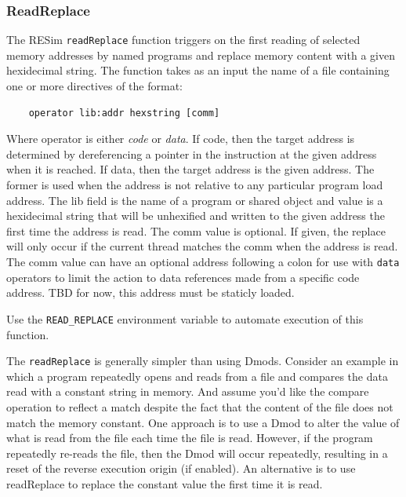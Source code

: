 \documentclass[titlepage]{article}
\begin{document}
\subsubsection{ReadReplace}
\label{read-replace}
The RESim {\tt readReplace} function triggers on the first reading of selected memory addresses
by named programs and replace memory content with a given hexidecimal string.  The function takes as an
input the name of a file containing one or more directives of the format:
\begin{verbatim}
    operator lib:addr hexstring [comm]
\end{verbatim}

Where operator is either \textit{code} or \textit{data}.  If code, then the target
address is determined by dereferencing a pointer in the instruction
at the given address when it is reached.  If data, then the target
address is the given address. The former is used when the address is not relative
to any particular program load address. 
The lib field is the name of a program or shared object and value
is a hexidecimal string that will be unhexified and written to the given
address the first time the address is read.  
The comm value is optional.  If given, the replace will only occur if the
current thread matches the comm when the address is read.  The comm value can have
an optional address following a colon for use with {\tt data} operators to limit the
action to data references made from a specific code address. TBD for now, this address must be staticly loaded. 

Use the {\tt READ\_REPLACE} environment variable to automate execution of this function.

The {\tt readReplace} is generally simpler than using Dmods.  Consider an example in which a program
repeatedly opens and reads from a file and compares the data read with a constant string in memory.
And assume you'd like the compare operation to reflect a match despite the fact that the content of
the file does not match the memory constant.  One approach is to use a Dmod to alter the value of what
is read from the file each time the file is read.  However, if the program repeatedly re-reads the file,
then the Dmod will occur repeatedly, resulting in a reset of the reverse execution origin (if enabled).
An alternative is to use readReplace to replace the constant value the first time it is read.  
\end{document}
